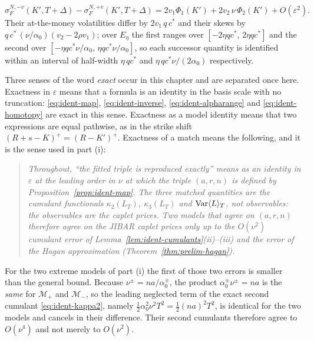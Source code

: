 \documentclass[../../../main.tex]{subfiles}
\begin{document}
\begin{theorem}
\begin{enumerate}[label=(\roman*)]
\begin{equation}\label{eq:ident-twodiff}
\sigma^{N,-v}_F(K',T+\Delta)-\sigma^{N,+v}_F(K',T+\Delta)=2v_1\Phi_1(K')+2v_2\,\nu\,\Phi_2(K')+O(\varepsilon^2).
\end{equation}
Their at-the-money volatilities differ by $2v_1\,q\,c^*$ and their skews by $q\,c^*\,(\nu/\alpha_0)(v_2-2\rho v_1)$; over $E_\eta$ the first ranges over $[-2\eta qc^*,\,2\eta qc^*]$ and the second over $[-\eta qc^*\nu/\alpha_0,\,\eta qc^*\nu/\alpha_0]$, so each successor quantity is identified within an interval of half-width $\eta\,qc^*$ and $\eta\,qc^*\nu/(2\alpha_0)$ respectively.
\end{enumerate}
\end{theorem}

Three senses of the word \emph{exact} occur in this chapter and are separated once here. Exactness in $\varepsilon$ means that a formula is an identity in the basis scale with no truncation: \eqref{eq:ident-map}, \eqref{eq:ident-inverse}, \eqref{eq:ident-alpharange} and \eqref{eq:ident-homotopy} are exact in this sense. Exactness as a model identity means that two expressions are equal pathwise, as in the strike shift $(R+s-K)^+=(R-K')^+$. Exactness of a match means the following, and it is the sense used in part (i):
\begin{quote}
\emph{Throughout, ``the fitted triple is reproduced exactly'' means as an identity in $\varepsilon$ at the leading order in $\nu$ at which the triple $(a,r,n)$ is defined by Proposition~\ref{prop:ident-map}. The three matched quantities are the cumulant functionals $\kappa_2(L_T)$, $\kappa_3(L_T)$ and $\operatorname{Var}\langle L\rangle_T$, not observables: the observables are the caplet prices. Two models that agree on $(a,r,n)$ therefore agree on the JIBAR caplet prices only up to the $O(\nu^2)$ cumulant error of Lemma~\ref{lem:ident-cumulants}(ii)--(iii) and the error of the Hagan approximation (Theorem~\ref{thm:prelim-hagan}).}
\end{quote}
For the two extreme models of part (i) the first of those two errors is smaller than the general bound. Because $\nu^{\pm}=na/\alpha_0^{\pm}$, the product $\alpha_0^{\pm}\nu^{\pm}=na$ is the \emph{same} for $\mathcal M_+$ and $\mathcal M_-$, so the leading neglected term of the exact second cumulant \eqref{eq:ident-kappa2}, namely $\tfrac12\alpha_0^2\nu^2T^2=\tfrac12(na)^2T^2$, is identical for the two models and cancels in their difference. Their second cumulants therefore agree to $O(\nu^4)$ and not merely to $O(\nu^2)$.
\end{document}
